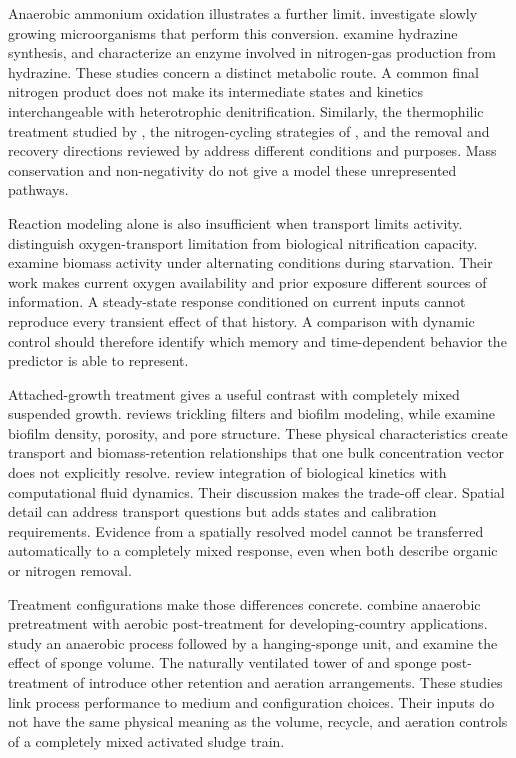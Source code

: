 Anaerobic ammonium oxidation illustrates a further limit. \citet{Strous1998} investigate slowly growing microorganisms that perform this conversion. \citet{Dietl2015} examine hydrazine synthesis, and \citet{Maalcke2016} characterize an enzyme involved in nitrogen-gas production from hydrazine. These studies concern a distinct metabolic route. A common final nitrogen product does not make its intermediate states and kinetics interchangeable with heterotrophic denitrification. Similarly, the thermophilic treatment studied by \citet{Vandekerckhove2018}, the nitrogen-cycling strategies of \citet{Xie2021}, and the removal and recovery directions reviewed by \citet{WinklerStraka2019} address different conditions and purposes. Mass conservation and non-negativity do not give a model these unrepresented pathways.

Reaction modeling alone is also insufficient when transport limits activity. \citet{StenstromSong1991} distinguish oxygen-transport limitation from biological nitrification capacity. \citet{Yilmaz2007} examine biomass activity under alternating conditions during starvation. Their work makes current oxygen availability and prior exposure different sources of information. A steady-state response conditioned on current inputs cannot reproduce every transient effect of that history. A comparison with dynamic control should therefore identify which memory and time-dependent behavior the predictor is able to represent.

Attached-growth treatment gives a useful contrast with completely mixed suspended growth. \citet{Wik2003} reviews trickling filters and biofilm modeling, while \citet{Zhang1994} examine biofilm density, porosity, and pore structure. These physical characteristics create transport and biomass-retention relationships that one bulk concentration vector does not explicitly resolve. \citet{SadinoRiquelme2023} review integration of biological kinetics with computational fluid dynamics. Their discussion makes the trade-off clear. Spatial detail can address transport questions but adds states and calibration requirements. Evidence from a spatially resolved model cannot be transferred automatically to a completely mixed response, even when both describe organic or nitrogen removal.

Treatment configurations make those differences concrete. \citet{Machdar1997} combine anaerobic pretreatment with aerobic post-treatment for developing-country applications. \citet{Tawfik2006} study an anaerobic process followed by a hanging-sponge unit, and \citet{Tawfik2010} examine the effect of sponge volume. The naturally ventilated tower of \citet{Mahmoud2010} and sponge post-treatment of \citet{Mahmoud2011} introduce other retention and aeration arrangements. These studies link process performance to medium and configuration choices. Their inputs do not have the same physical meaning as the volume, recycle, and aeration controls of a completely mixed activated sludge train.

